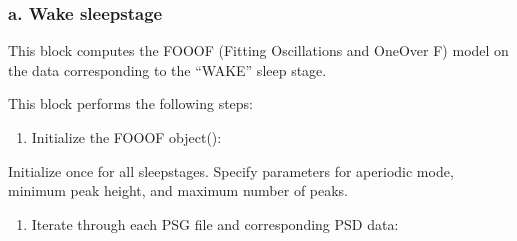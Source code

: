 \documentclass[letterpaper,10pt,english]{sphinxmanual}
\begin{document}
\subsubsection{a. Wake sleepstage}
\label{\detokenize{code:a-wake-sleepstage}}
\sphinxAtStartPar
This block computes the FOOOF (Fitting Oscillations and One\sphinxhyphen{}Over F) model on the data corresponding to the “WAKE” sleep stage.

\sphinxAtStartPar
This block performs the following steps:
\begin{enumerate}
%
\item {} 
\sphinxAtStartPar
Initialize the FOOOF object():

\end{enumerate}

\sphinxAtStartPar
Initialize once for all sleepstages. Specify parameters for aperiodic mode, minimum peak height, and maximum number of peaks.
\begin{enumerate}
%
\setcounter{enumi}{1}
\item {} 
\sphinxAtStartPar
Iterate through each PSG file and corresponding PSD data:

\end{enumerate}
\end{document}
